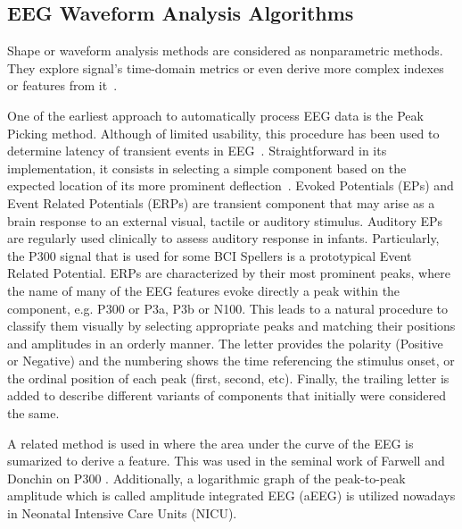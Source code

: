 
\subsection{EEG Waveform Analysis Algorithms}

Shape or waveform analysis methods are considered as nonparametric methods.  They explore signal's time-domain metrics or even derive more complex indexes or features from it~\cite{Thakor2009}. 

One of the earliest approach to automatically process EEG data is the Peak Picking method.  Although of limited usability, this procedure has been used to determine latency of transient events in EEG~\cite{Jaskowski2000,Zhang2011}.  Straightforward in its implementation, it consists in selecting a simple component based on the expected location of its more prominent deflection~\cite{Ouyang2017}.  Evoked Potentials (EPs) and Event Related Potentials (ERPs) are transient component that may arise as a brain response to an external visual, tactile or auditory stimulus.  Auditory EPs are regularly used clinically to assess auditory response in infants.  Particularly, the P300 signal that is used for some BCI Spellers is a prototypical Event Related Potential.  ERPs are characterized by their most prominent peaks, where the name of many of the EEG features evoke directly a peak within the component, e.g. P300 or P3a, P3b or N100.  This leads to a natural procedure to classify them visually by selecting appropriate peaks and matching their positions and amplitudes in an orderly manner.  The letter provides the polarity (Positive or Negative) and the numbering shows the time referencing the stimulus onset, or the ordinal position of each peak (first, second, etc).   Finally, the trailing letter is added to describe different variants of components that initially were considered the same.

A related method is used in \cite{Alvarado-Gonzalez2016} where the area under the curve of the EEG is sumarized to derive a feature.  This was used in the seminal work of Farwell and Donchin on P300 \cite{Farwell1988,WolpawJonathanR2012}. Additionally, a logarithmic graph of the peak-to-peak amplitude which is called amplitude integrated EEG (aEEG) \cite{Shah2015} is utilized nowadays in Neonatal Intensive Care Units (NICU).

